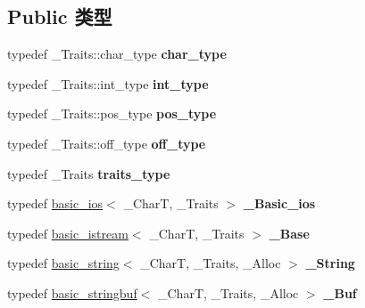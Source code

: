 \subsection*{Public 类型}
\begin{DoxyCompactItemize}
\item 
\mbox{\label{classbasic__istringstream_a0f5e07933211e8324199205ff3fad7d3}} 
typedef \+\_\+\+Traits\+::char\+\_\+type {\bfseries char\+\_\+type}
\item 
\mbox{\label{classbasic__istringstream_a0f977f483fbf59680fb97168c2ecc3bc}} 
typedef \+\_\+\+Traits\+::int\+\_\+type {\bfseries int\+\_\+type}
\item 
\mbox{\label{classbasic__istringstream_a4481587d66d3d593eaecca0a85f3da0b}} 
typedef \+\_\+\+Traits\+::pos\+\_\+type {\bfseries pos\+\_\+type}
\item 
\mbox{\label{classbasic__istringstream_aee82e056b62074dceee3503462b2e4eb}} 
typedef \+\_\+\+Traits\+::off\+\_\+type {\bfseries off\+\_\+type}
\item 
\mbox{\label{classbasic__istringstream_a1d5ee6f7d7c56b34ec7fdf1c1924ace3}} 
typedef \+\_\+\+Traits {\bfseries traits\+\_\+type}
\item 
\mbox{\label{classbasic__istringstream_a87c3bb8dec6ebe5cea573827591a81b5}} 
typedef \hyperlink{classbasic__ios}{basic\+\_\+ios}$<$ \+\_\+\+CharT, \+\_\+\+Traits $>$ {\bfseries \+\_\+\+Basic\+\_\+ios}
\item 
\mbox{\label{classbasic__istringstream_af0494626bb2a22027197fe843467aedd}} 
typedef \hyperlink{classbasic__istream}{basic\+\_\+istream}$<$ \+\_\+\+CharT, \+\_\+\+Traits $>$ {\bfseries \+\_\+\+Base}
\item 
\mbox{\label{classbasic__istringstream_a8fdb895ede3f09205aaad6090d3fd5e0}} 
typedef \hyperlink{classbasic__string}{basic\+\_\+string}$<$ \+\_\+\+CharT, \+\_\+\+Traits, \+\_\+\+Alloc $>$ {\bfseries \+\_\+\+String}
\item 
\mbox{\label{classbasic__istringstream_af8c9df1089e26f70acdcdf41e3bb3329}} 
typedef \hyperlink{classbasic__stringbuf}{basic\+\_\+stringbuf}$<$ \+\_\+\+CharT, \+\_\+\+Traits, \+\_\+\+Alloc $>$ {\bfseries \+\_\+\+Buf}
\end{DoxyCompactItemize}
